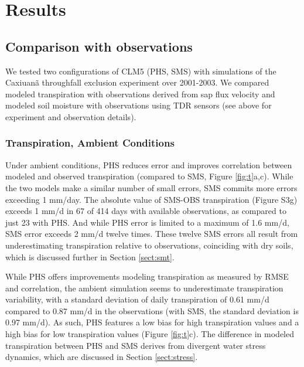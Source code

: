 \documentclass[draft,linenumbers]{agujournal}
\begin{document}
\section{Results}  

\subsection{Comparison with observations}
\label{sect:obs}

We tested two configurations of CLM5 (PHS, SMS) with simulations of the Caxiuan\~a throughfall exclusion experiment over 2001-2003. We compared modeled transpiration with observations derived from sap flux velocity and modeled soil moisture with observations using TDR sensors (see above for experiment and observation details).

\subsubsection{Transpiration, Ambient Conditions}
Under ambient conditions, PHS reduces error and improves correlation between modeled and observed transpiration (compared to SMS, Figure \ref{fig:t}a,c).
While the two models make a similar number of small errors, SMS commits more errors exceeding 1 mm/day.
The absolute value of SMS-OBS transpiration (Figure S3g) exceeds 1 mm/d in 67 of 414 days with available observations, as compared to just 23 with PHS.
And while PHS error is limited to a maximum of 1.6 mm/d, SMS error exceeds 2 mm/d twelve times. These twelve SMS errors all result from underestimating transpiration relative to observations,
coinciding with dry soils, which is discussed further in Section \ref{sect:smt}. 

While PHS offers improvements modeling transpiration as measured by RMSE and correlation, the ambient simulation seems to underestimate transpiration variability, with a standard deviation of daily transpiration of 0.61 mm/d compared to 0.87 mm/d in the observations (with SMS, the standard deviation is 0.97 mm/d).
As such, PHS features a low bias for high transpiration values and a high bias for low transpiration values (Figure \ref{fig:t}c).
The difference in modeled transpiration between PHS and SMS derives from divergent water stress dynamics, which are discussed in Section \ref{sect:stress}.
\end{document}
